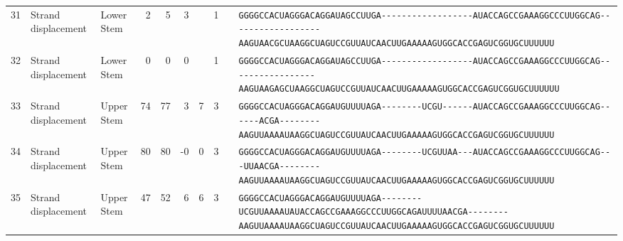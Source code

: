 \begin{tabular}{rllrrrrrcl}
 31 & Strand displacement & Lower Stem & 2 & 5 & 3 &  & 1 &  &
 \color{ucsfdarkgrey}\verb|GGGGCCACUAGGGACAGGAU|\color{ucsforange}\verb|AGCCUU|\color{ucsfblue}\verb|GA------------------|\color{ucsfpurple}\verb|AUACCAGCCGAAAGGCCCUUGGCAG|\color{ucsfblue}\verb|------------------AAGU|\color{ucsforange}\verb|AACGCUAA|\color{ucsfnavy}\verb|GGCUAGUCC|\color{ucsforange}\verb|GUUAUCA|\color{ucsfteal}\verb|ACUUGAAAAAGU|\color{ucsforange}\verb|GGCACCGAGUCGGUGCUUUUUU| \\

 32 & Strand displacement & Lower Stem & 0 & 0 & 0 &  & 1 &  &
 \color{ucsfdarkgrey}\verb|GGGGCCACUAGGGACAGGAU|\color{ucsforange}\verb|AGCCUU|\color{ucsfblue}\verb|GA------------------|\color{ucsfpurple}\verb|AUACCAGCCGAAAGGCCCUUGGCAG|\color{ucsfblue}\verb|-----------------AAGUA|\color{ucsforange}\verb|AGAGCUAA|\color{ucsfnavy}\verb|GGCUAGUCC|\color{ucsforange}\verb|GUUAUCA|\color{ucsfteal}\verb|ACUUGAAAAAGU|\color{ucsforange}\verb|GGCACCGAGUCGGUGCUUUUUU| \\

 33 & Strand displacement & Upper Stem & 74 & 77 & 3 & 7 & 3 &  &
 \color{ucsfdarkgrey}\verb|GGGGCCACUAGGGACAGGAU|\color{ucsforange}\verb|GUUUUA|\color{ucsfblue}\verb|GA--------UCGU------|\color{ucsfpurple}\verb|AUACCAGCCGAAAGGCCCUUGGCAG|\color{ucsfblue}\verb|------ACGA--------AAGU|\color{ucsforange}\verb|UAAAAUAA|\color{ucsfnavy}\verb|GGCUAGUCC|\color{ucsforange}\verb|GUUAUCA|\color{ucsfteal}\verb|ACUUGAAAAAGU|\color{ucsforange}\verb|GGCACCGAGUCGGUGCUUUUUU| \\

 34 & Strand displacement & Upper Stem & 80 & 80 & -0 & 0 & 3 &  &
 \color{ucsfdarkgrey}\verb|GGGGCCACUAGGGACAGGAU|\color{ucsforange}\verb|GUUUUA|\color{ucsfblue}\verb|GA--------UCGUUAA---|\color{ucsfpurple}\verb|AUACCAGCCGAAAGGCCCUUGGCAG|\color{ucsfblue}\verb|---UUAACGA--------AAGU|\color{ucsforange}\verb|UAAAAUAA|\color{ucsfnavy}\verb|GGCUAGUCC|\color{ucsforange}\verb|GUUAUCA|\color{ucsfteal}\verb|ACUUGAAAAAGU|\color{ucsforange}\verb|GGCACCGAGUCGGUGCUUUUUU| \\

 35 & Strand displacement & Upper Stem & 47 & 52 & 6 & 6 & 3 &  &
 \color{ucsfdarkgrey}\verb|GGGGCCACUAGGGACAGGAU|\color{ucsforange}\verb|GUUUUA|\color{ucsfblue}\verb|GA--------UCGUUAAAAU|\color{ucsfpurple}\verb|AUACCAGCCGAAAGGCCCUUGGCAG|\color{ucsfblue}\verb|AUUUUAACGA--------AAGU|\color{ucsforange}\verb|UAAAAUAA|\color{ucsfnavy}\verb|GGCUAGUCC|\color{ucsforange}\verb|GUUAUCA|\color{ucsfteal}\verb|ACUUGAAAAAGU|\color{ucsforange}\verb|GGCACCGAGUCGGUGCUUUUUU| \\


\end{tabular}
